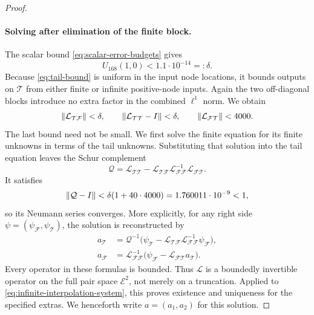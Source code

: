 \begin{proof}
\paragraph{Solving after elimination of the finite block.}
The scalar bound \eqref{eq:scalar-error-budgets} gives
\[
 U_{168}(1,0)<1.1\cdot10^{-14}=:\delta.
\]
Because \eqref{eq:tail-bound} is uniform in the input node locations, it
bounds outputs on \(\mathcal T\) from either finite or infinite positive-node
inputs.  Again the two off-diagonal blocks introduce no extra factor in the
combined \(\ell^1\) norm.  We obtain
\begin{equation}
 \left\lVert\mathcal L_{\mathcal T\mathcal F}\right\rVert<\delta,\qquad
 \left\lVert\mathcal L_{\mathcal T\mathcal T}-I\right\rVert<\delta,\qquad
 \left\lVert\mathcal L_{\mathcal F\mathcal T}\right\rVert<4000.
 \label{eq:tail-operator-blocks}
\end{equation}
The last bound need not be small.  We first solve the finite equation for
its finite unknowns in terms of the tail unknowns.  Substituting that solution
into the tail equation leaves the Schur complement
\[
 \mathcal Q=\mathcal L_{\mathcal T\mathcal T}
 -\mathcal L_{\mathcal T\mathcal F}
  \mathcal L_{\mathcal F\mathcal F}^{-1}
  \mathcal L_{\mathcal F\mathcal T}.
\]
It satisfies
\[
 \left\lVert\mathcal Q-I\right\rVert
 <\delta(1+40\cdot4000)=1.760011\cdot10^{-9}<1,
\]
so its Neumann series converges.  More explicitly, for any right side
\(\psi=(\psi_{\mathcal F},\psi_{\mathcal T})\), the solution is reconstructed
by
\begin{align*}
 a_{\mathcal T}
 &=\mathcal Q^{-1}\bigl(\psi_{\mathcal T}
   -\mathcal L_{\mathcal T\mathcal F}
    \mathcal L_{\mathcal F\mathcal F}^{-1}\psi_{\mathcal F}\bigr),\\
 a_{\mathcal F}
 &=\mathcal L_{\mathcal F\mathcal F}^{-1}
   \bigl(\psi_{\mathcal F}-\mathcal L_{\mathcal F\mathcal T}a_{\mathcal T}\bigr).
\end{align*}
Every operator in these formulas is bounded.  Thus \(\mathcal L\) is a
boundedly invertible operator on the full pair space \(\mathcal E^2\), not
merely on a truncation.  Applied to \eqref{eq:infinite-interpolation-system},
this proves existence and uniqueness for the specified extras.
We henceforth write \(a=(a_1,a_2)\) for this solution.


\end{proof}
